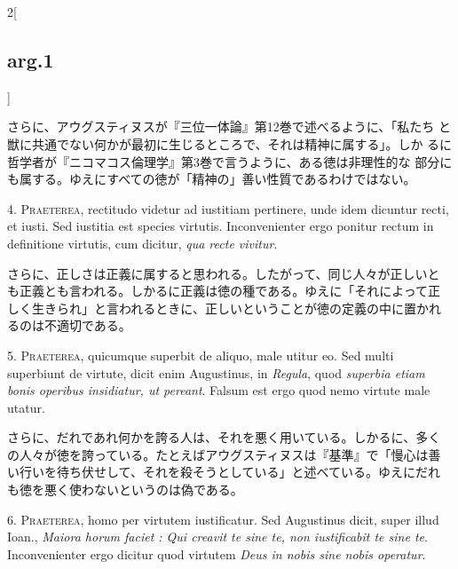\documentclass[paper=a4paper,fontsize=10pt,jafontsize=9pt,titlepage]{jlreq}
\begin{document}
\begin{paracol}{2}[\subsection{arg.1}]
\switchcolumn

さらに、アウグスティヌスが『三位一体論』第12巻で述べるように、「私たち
と獣に共通でない何かが最初に生じるところで、それは精神に属する」。しか
るに哲学者が『ニコマコス倫理学』第3巻で言うように、ある徳は非理性的な
部分にも属する。ゆえにすべての徳が「精神の」善い性質であるわけではない。


4. {\scshape Praeterea}, rectitudo videtur ad iustitiam pertinere,
unde idem dicuntur recti, et iusti. Sed iustitia est species
virtutis. Inconvenienter ergo ponitur rectum in definitione virtutis,
cum dicitur, {\itshape qua recte vivitur}.

\switchcolumn

さらに、正しさは正義に属すると思われる。したがって、同じ人々が正しいと
も正義とも言われる。しかるに正義は徳の種である。ゆえに「それによって正
しく生きられ」と言われるときに、正しいということが徳の定義の中に置かれ
るのは不適切である。


5. {\scshape Praeterea}, quicumque superbit de aliquo, male utitur
eo. Sed multi superbiunt de virtute, dicit enim Augustinus, in
{\itshape Regula}, quod {\itshape superbia etiam bonis operibus
insidiatur, ut pereant}. Falsum est ergo quod nemo virtute male
utatur.

\switchcolumn

さらに、だれであれ何かを誇る人は、それを悪く用いている。しかるに、多く
の人々が徳を誇っている。たとえばアウグスティヌスは『基準』で「慢心は善
い行いを待ち伏せして、それを殺そうとしている」と述べている。ゆえにだれ
も徳を悪く使わないというのは偽である。


6. {\scshape Praeterea}, homo per virtutem iustificatur. Sed
Augustinus dicit, super illud Ioan., {\itshape Maiora horum faciet :
Qui creavit te sine te, non iustificabit te sine te}. Inconvenienter
ergo dicitur quod virtutem {\itshape Deus in nobis sine nobis
operatur}.


\end{paracol}
\end{document}

